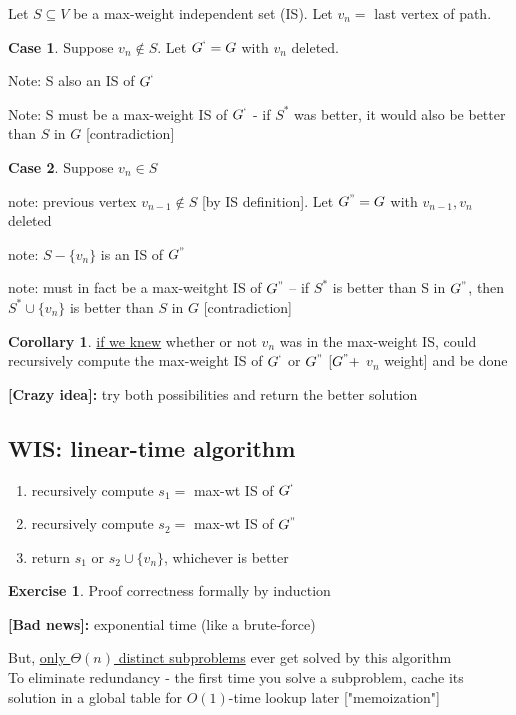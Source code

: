 \documentclass[a4paper,12pt]{article}
\theoremstyle{plain}
\theoremstyle{definition}
\newtheorem*{corollary}{Corollary}
\newtheorem{problem}{Exercise}[section]
\newtheorem{case}{Case}[subsection]
\theoremstyle{remark}
\begin{document}
Let $S \subseteq V$ be a max-weight independent set (IS). Let $v_n =$ last vertex of path.
\begin{case}
Suppose $v_n \notin S$. Let $G^` = G$ with $v_n$ deleted.

Note: S also an IS of $G^`$

Note: S must be a max-weight IS of $G^`$ - if $S^*$ was better, it would also be better than $S$ in $G$ [contradiction]
\end{case}
\begin{case}
Suppose $v_n \in S$

note: previous vertex $v_{n-1} \notin S$ [by IS definition]. Let $G^" = G$ with $v_{n-1}, v_n$ deleted

note: $S - \{v_n\}$ is an IS of $G^"$

note: must in fact be a max-weitght IS of $G^"$ -- if $S^*$ is better than S in $G^"$, then $S^* \cup \{v_n\}$ is better than $S$ in $G$ [contradiction] 
\end{case}

\begin{corollary}\underline{if we knew} whether or not $v_n$ was in the max-weight IS, could recursively compute the max-weight IS of $G^`$ or $G^"$ [$G^" +$ $v_n$ weight] and be done\end{corollary}
\textbf{[Crazy idea]:} try both possibilities and return the better solution



\subsection{WIS: linear-time algorithm}
\begin{enumerate}
	\item recursively compute $s_1 =$ max-wt IS of $G^`$
	\item recursively compute $s_2 =$ max-wt IS of $G^"$
	\item return $s_1$ or $s_2 \cup \{v_n\}$, whichever is better
\end{enumerate}
\begin{problem} Proof correctness formally by induction\end{problem}

\textbf{[Bad news]:} exponential time (like a brute-force)\

But, \underline{only $\Theta(n)$ distinct subproblems} ever get solved by this algorithm
\\

To eliminate redundancy - the first time you solve a subproblem, cache its solution in a global table for $O(1)$-time lookup later ["memoization"]
\\
\end{document}
